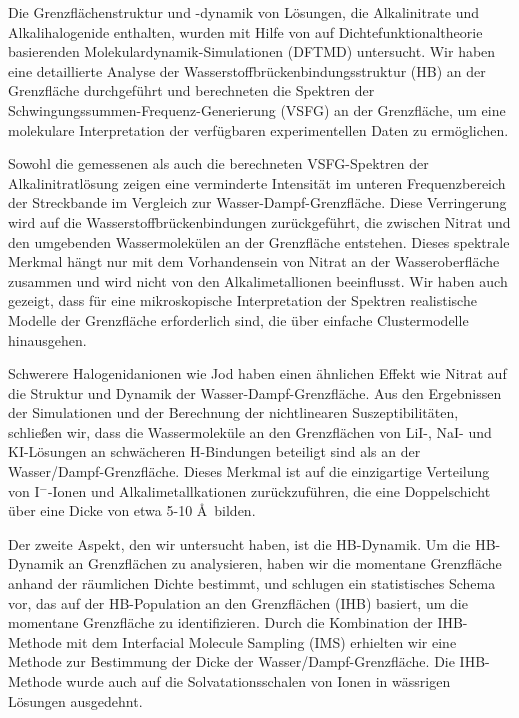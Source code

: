 \documentclass[
11pt, %
ngerman,
english, %
singlespacing, %
headsepline, %
]{MastersDoctoralThesis} %
\newcommand{\I}{I$^{-}$\xspace}
\let\oldAA\AA
\renewcommand{\AA}{\oldAA\xspace}
\newcommand{\A}{\oldAA}
\begin{document}
{
\begin{extraAbstract}
\addchaptertocentry{\abstractname} %
Die Grenzflächenstruktur und -dynamik von Lösungen, die Alkalinitrate und Alkalihalogenide enthalten, 
wurden mit Hilfe von auf Dichtefunktionaltheorie basierenden Molekulardynamik-Simulationen (DFTMD) untersucht.
Wir haben eine detaillierte Analyse der Wasserstoffbrückenbindungsstruktur (HB) an der Grenzfläche durchgeführt und
berechneten die Spektren der Schwingungssummen-Frequenz-Generierung (VSFG) an der Grenzfläche, um eine molekulare Interpretation der verfügbaren experimentellen Daten zu ermöglichen.

Sowohl die gemessenen als auch die berechneten VSFG-Spektren der Alkalinitratlösung zeigen eine verminderte Intensität
im unteren Frequenzbereich der Streckbande im Vergleich zur Wasser-Dampf-Grenzfläche.
Diese Verringerung wird auf die Wasserstoffbrückenbindungen zurückgeführt, die zwischen Nitrat und den umgebenden Wassermolekülen an der Grenzfläche entstehen.
Dieses spektrale Merkmal hängt nur mit dem Vorhandensein von Nitrat an der Wasseroberfläche zusammen und wird nicht von den Alkalimetallionen beeinflusst.
Wir haben auch gezeigt, dass für eine mikroskopische Interpretation der Spektren
realistische Modelle der Grenzfläche erforderlich sind, die über einfache Clustermodelle hinausgehen.

Schwerere Halogenidanionen wie Jod haben einen ähnlichen Effekt wie Nitrat auf die Struktur und Dynamik der Wasser-Dampf-Grenzfläche.
Aus den Ergebnissen der Simulationen und der Berechnung der nichtlinearen Suszeptibilitäten,
schließen wir, dass die Wassermoleküle an den Grenzflächen von LiI-, NaI- und KI-Lösungen
an schwächeren H-Bindungen beteiligt sind als an der Wasser/Dampf-Grenzfläche.
Dieses Merkmal ist auf die einzigartige Verteilung von \I-Ionen und Alkalimetallkationen zurückzuführen,
die eine Doppelschicht über eine Dicke von etwa 5-10 \A\  bilden.

Der zweite Aspekt, den wir untersucht haben, ist die HB-Dynamik.
Um die HB-Dynamik an Grenzflächen zu analysieren,
haben wir die momentane Grenzfläche anhand der räumlichen Dichte bestimmt,
und schlugen ein statistisches Schema vor, das auf der HB-Population an den Grenzflächen (IHB) basiert, um die momentane Grenzfläche zu identifizieren.
Durch die Kombination der IHB-Methode mit dem Interfacial Molecule Sampling (IMS) erhielten wir eine Methode zur Bestimmung der Dicke der Wasser/Dampf-Grenzfläche.
Die IHB-Methode wurde auch auf die Solvatationsschalen von Ionen in wässrigen Lösungen ausgedehnt.

\end{extraAbstract}
}
\end{document}
